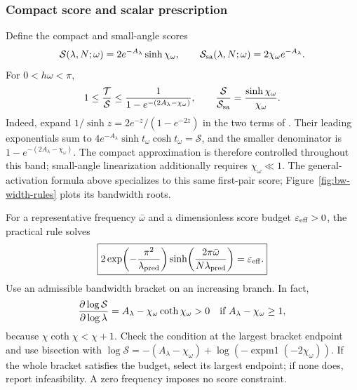 \subsubsection{Compact score and scalar prescription}
Define the compact and small-angle scores
\begin{equation}
 \mathcal S(\lambda,N;\omega)=2e^{-A_\lambda}\sinh\chi_\omega,
 \qquad
 \mathcal S_{\rm sa}(\lambda,N;\omega)=2\chi_\omega e^{-A_\lambda}.
 \label{eq:bandwidth-scores}
\end{equation}
For $0<h\omega<\pi$,
\begin{equation}
 1\le\frac{\mathcal T}{\mathcal S}
 \le\frac1{1-e^{-(2A_\lambda-\chi_\omega)}},
 \qquad
 \frac{\mathcal S}{\mathcal S_{\rm sa}}
 =\frac{\sinh\chi_\omega}{\chi_\omega}.
 \label{eq:bandwidth-score-comparison}
\end{equation}
Indeed, expand $1/\sinh z=2e^{-z}/(1-e^{-2z})$ in the two terms of
. Their leading exponentials sum to
$4e^{-A_\lambda}\sinh t_\omega\cosh t_\omega=\mathcal S$, and the
smaller denominator is $1-e^{-(2A_\lambda-\chi_\omega)}$.
The compact approximation is therefore controlled throughout this band;
small-angle linearization additionally requires $\chi_\omega\ll1$.
The general-activation formula above specializes to this same first-pair
score; Figure~\ref{fig:bw-width-rules} plots its bandwidth roots.

For a representative frequency $\bar\omega$ and a dimensionless score budget
$\varepsilon_{\rm eff}>0$, the practical rule solves
\begin{equation}
 \boxed{2\exp\!\left(-\frac{\pi^2}{\lambda_{\rm pred}}\right)
 \sinh\!\left(\frac{2\pi\bar\omega}{N\lambda_{\rm pred}}\right)
 =\varepsilon_{\rm eff}.}
 \label{eq:bandwidth-prescription}
\end{equation}
Use an admissible bandwidth bracket on an increasing branch. In fact,
\begin{equation}
 \frac{\partial\log\mathcal S}{\partial\log\lambda}
 =A_\lambda-\chi_\omega\coth\chi_\omega>0
 \quad\hbox{if }A_\lambda-\chi_\omega\ge1,
 \label{eq:bandwidth-monotonicity}
\end{equation}
because $\chi\coth\chi<\chi+1$. Check the condition at the largest bracket endpoint and use bisection with
$\log\mathcal S=-(A_\lambda-\chi_\omega)
 +\log(-\operatorname{expm1}(-2\chi_\omega))$.
If the whole bracket satisfies the budget, select its largest endpoint;
if none does, report infeasibility. A zero frequency imposes no score constraint.

